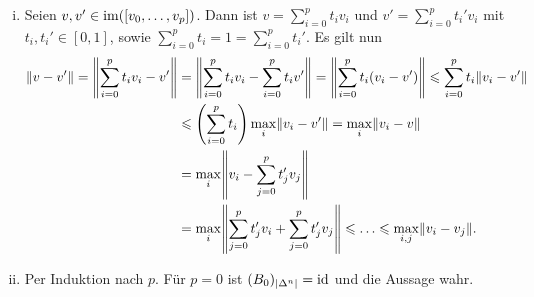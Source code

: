\begin{beweis}
	\leavevmode
	\begin{enumerate}[(i)]
		\item Seien $v,v' \in \im \enbrace*{[v_0, \ldots ,v_p]}$. Dann ist $v = \sum_{i=0}^{p} t_i v_i$ und $v' = \sum_{i=0}^{p} t_i' v_i$ mit $t_i, t_i' \in [0,1]$, sowie
		$\sum_{i=0}^{p} t_i =1 = \sum_{i=0}^{p} t_i'$. Es gilt nun
		\begin{align*}
			\norm*{v-v'} = \norm*{\sum_{i=0}^{p} t_i v_i - v'} &= \norm*{\sum_{i=0}^{p} t_i v_i - \sum_{i=0}^{p} t_i v'} = \norm*{\sum_{i=0}^{p} t_i(v_i -v')}
			\le \sum_{i=0}^{p} t_i \norm{v_i -v'}   \\
			&\le \enbrace*{\sum_{i=0}^{p} t_i} \max_i \norm*{v_i -v'} = \max_i \norm*{v_i -v} \\
			&= \max_i \norm*{v_i - \sum_{j=0}^{p} t'_j v_j} \\
			&= \max_i \norm*{ \sum_{j=0}^{p} t'_j v_i + \sum_{j=0}^p t'_j v_j} 
			\le \ldots \le \max_{i,j} \norm{v_i - v_j}.   
		\end{align*}
		\item Per Induktion nach $p$. Für $p=0$ ist $(B_0)_{\lvert\Delta^n\rvert}=\operatorname{id}$ und die Aussage wahr.
	

\end{enumerate}
\end{beweis}
